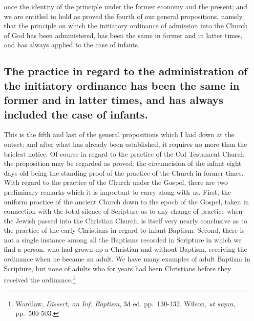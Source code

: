 \documentclass[]{book}
\begin{document}
once the identity of the principle under the former economy and the present; and we are entitled to hold as proved the fourth of our general propositions, namely, that the principle on which the initiatory ordinance of admission into the Church of God has been administered, has been the same in former and in latter times, and has always applied to the case of infants.

\hypertarget{the-practice-in-regard-to-the-administration-of-the-initiatory-ordinance-has-been-the-same-in-former-and-in-latter-times-and-has-always-included-the-case-of-infants.}{%
\subsection{The practice in regard to the administration of the initiatory ordinance has been the same in former and in latter times, and has always included the case of infants.}\label{the-practice-in-regard-to-the-administration-of-the-initiatory-ordinance-has-been-the-same-in-former-and-in-latter-times-and-has-always-included-the-case-of-infants.}}

This is the fifth and last of the general propositions which I laid down at the outset; and after what has already been established, it requires no more than the briefest notice. Of course in regard to the practice of the Old Testament Church the proposition may be regarded as proved; the circumcision of the infant eight days old being the standing proof of the practice of the Church in former times. With regard to the practice of the Church under the Gospel, there are two preliminary remarks which it is important to carry along with us. First, the uniform practice of the ancient Church down to the epoch of the Gospel, taken in connection with the total silence of Scripture as to any change of practice when the Jewish passed into the Christian Church, is itself very nearly conclusive as to the practice of the early Christians in regard to infant Baptism. Second, there is not a single instance among all the Baptisms recorded in Scripture in which we find a person, who had grown up a Christian and without Baptism, receiving the ordinance when he became an adult. We have many examples of adult Baptism in Scripture, but none of adults who for years had been Christians before they received the ordinance.\footnote{Wardlaw, \emph{Dissert, on Inf. Baptism}, 3d ed. pp.~130-132. Wilson, \emph{ut supra}, pp.~500-503.}
\end{document}
